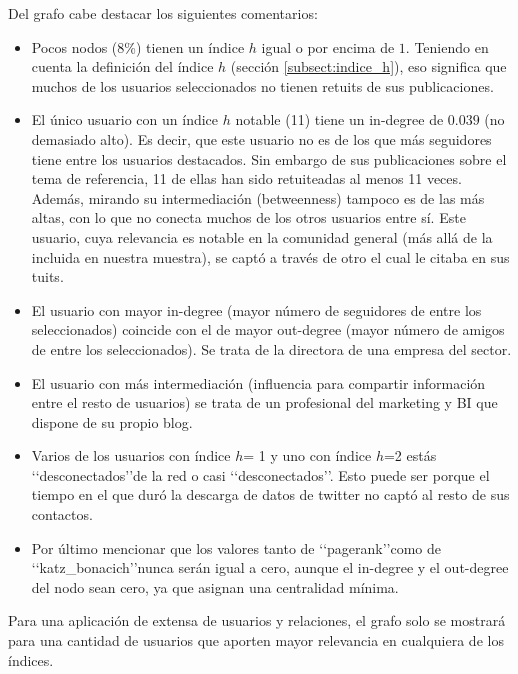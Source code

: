 
Del grafo cabe destacar los siguientes comentarios:
\begin{itemize}
\item Pocos nodos ($8$\%) tienen un índice $h$ igual o por encima de $1$. Teniendo en cuenta 
la definición del índice $h$ (sección \ref{subsect:indice_h}), eso significa que muchos de los 
usuarios seleccionados no tienen retuits de sus publicaciones.

\item El único usuario con un índice $h$ notable (11) tiene un in-degree de $0.039$ (no demasiado alto). 
Es decir, que este usuario no es de los que más seguidores tiene entre los usuarios destacados. Sin
embargo de sus publicaciones sobre el tema de referencia, 11 de ellas han sido retuiteadas al menos
11 veces. Además, mirando su intermediación (betweenness) tampoco es de las más altas, con lo que 
no conecta muchos de los otros usuarios entre sí. Este usuario, cuya relevancia es notable en la comunidad
general (más allá de la incluida en nuestra muestra), se captó a través de otro el cual le citaba en 
sus tuits. 


\item El usuario con mayor in-degree (mayor número de seguidores de entre los seleccionados) coincide 
con el de mayor out-degree (mayor número de amigos de entre los seleccionados). Se trata de la 
directora de una empresa del sector. 

\item El usuario con más intermediación (influencia para compartir información entre el resto de usuarios) se trata de un profesional del marketing y BI que dispone de su propio blog.


\item Varios de los usuarios con índice $h$= 1 y uno con índice $h$=2 estás \lq\lq desconectados\rq\rq de la red o casi \lq\lq desconectados\rq\rq. Esto puede ser porque el tiempo en el que duró la descarga de datos de twitter no captó al resto de sus contactos.


\item Por último mencionar que los valores tanto de \lq\lq pagerank\rq\rq como de
\lq\lq katz\_bonacich\rq\rq nunca serán igual a cero, aunque el in-degree y el out-degree del nodo 
sean cero, ya que asignan una centralidad mínima.
\end{itemize}

Para una aplicación de extensa de usuarios y relaciones, el grafo solo se mostrará para una cantidad de usuarios que aporten mayor relevancia en cualquiera de los índices.